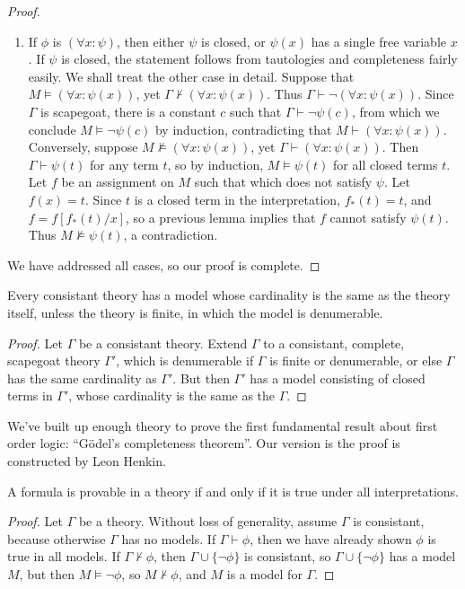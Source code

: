 \begin{proof}
\begin{enumerate}
        \item If $\phi$ is $(\forall x: \psi)$, then either $\psi$ is closed, or $\psi(x)$ has a single free variable $x$. If $\psi$ is closed, the statement follows from tautologies and completeness fairly easily. We shall treat the other case in detail. Suppose that $M \vDash (\forall x: \psi(x))$, yet $\Gamma \not \vdash (\forall x: \psi(x))$. Thus $\Gamma \vdash \neg (\forall x: \psi(x))$. Since $\Gamma$ is scapegoat, there is a constant $c$ such that $\Gamma \vdash \neg \psi(c)$, from which we conclude $M \vDash \neg \psi(c)$ by induction, contradicting that $M \vdash (\forall x: \psi(x))$. Conversely, suppose $M \not \vDash (\forall x: \psi(x))$, yet $\Gamma \vdash (\forall x: \psi(x))$. Then $\Gamma \vdash \psi(t)$ for any term $t$, so by induction, $M \vDash \psi(t)$ for all closed terms $t$. Let $f$ be an assignment on $M$ such that which does not satisfy $\psi$. Let $f(x) = t$. Since $t$ is a closed term in the interpretation, $f_*(t) = t$, and $f = f[f_*(t)/x]$, so a previous lemma implies that $f$ cannot satisfy $\psi(t)$. Thus $M \not \vDash \psi(t)$, a contradiction.
    \end{enumerate}
    We have addressed all cases, so our proof is complete.
\end{proof}

\begin{theorem}
    Every consistant theory has a model whose cardinality is the same as the theory itself, unless the theory is finite, in which the model is denumerable.
\end{theorem}
\begin{proof}
    Let $\Gamma$ be a consistant theory. Extend $\Gamma$ to a consistant, complete, scapegoat theory $\Gamma'$, which is denumerable if $\Gamma$ is finite or denumerable, or else $\Gamma$ has the same cardinality as $\Gamma'$. But then $\Gamma'$ has a model consisting of closed terms in $\Gamma'$, whose cardinality is the same as the $\Gamma$.
\end{proof}

We've built up enough theory to prove the first fundamental result about first order logic: ``G\"{o}del's completeness theorem''. Our version is the proof is constructed by Leon Henkin.

\begin{theorem}[G\"{o}del]
    A formula is provable in a theory if and only if it is true under all interpretations.
\end{theorem}
\begin{proof}
    Let $\Gamma$ be a theory. Without loss of generality, assume $\Gamma$ is consistant, because otherwise $\Gamma$ has no models. If $\Gamma \vdash \phi$, then we have already shown $\phi$ is true in all models. If $\Gamma \not \vdash \phi$, then $\Gamma \cup \{ \neg \phi \}$ is consistant, so $\Gamma \cup \{ \neg \phi \}$ has a model $M$, but then $M \vDash \neg \phi$, so $M \not \vdash \phi$, and $M$ is a model for $\Gamma$.
\end{proof}

